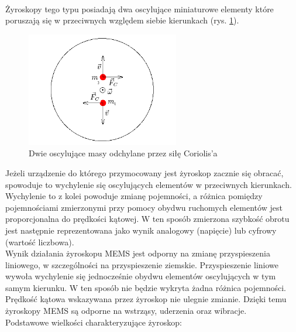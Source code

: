 \\
Żyroskopy tego typu posiadają dwa oscylujące miniaturowe elementy które poruszają się w przeciwnych względem siebie kierunkach (rys. \ref{fig:ZyroCoriolis}). 
\begin{figure}[!ht]
 \centering
 \includegraphics[height=50mm]{../images/ch04/gyro-coriolis.png}
 \caption{Dwie oscylujące masy odchylane przez siłę Coriolis'a}
 \label{fig:ZyroCoriolis}
\end{figure}
Jeżeli urządzenie do którego przymocowany jest żyroskop zacznie się obracać, spowoduje to wychylenie się oscylujących elementów w przeciwnych kierunkach. Wychylenie to z kolei powoduje zmianę pojemności, a różnica pomiędzy pojemnościami zmierzonymi przy pomocy obydwu ruchomych elementów jest proporcjonalna do prędkości kątowej. W ten sposób zmierzona szybkość obrotu jest następnie reprezentowana jako wynik analogowy (napięcie) lub cyfrowy (wartość liczbowa).
\\
Wynik działania żyroskopu MEMS jest odporny na zmianę przyspieszenia liniowego, w szczególności na przyspieszenie ziemskie. Przyspieszenie liniowe wywoła wychylenie się jednocześnie obydwu elementów oscylujących w tym samym kierunku. W ten sposób nie będzie wykryta żadna różnica pojemności. Prędkość kątowa wskazywana przez żyroskop nie ulegnie zmianie. Dzięki temu żyroskopy MEMS są odporne na wstrząsy, uderzenia oraz wibracje.
\\
Podstawowe wielkości charakteryzujące żyroskop:
